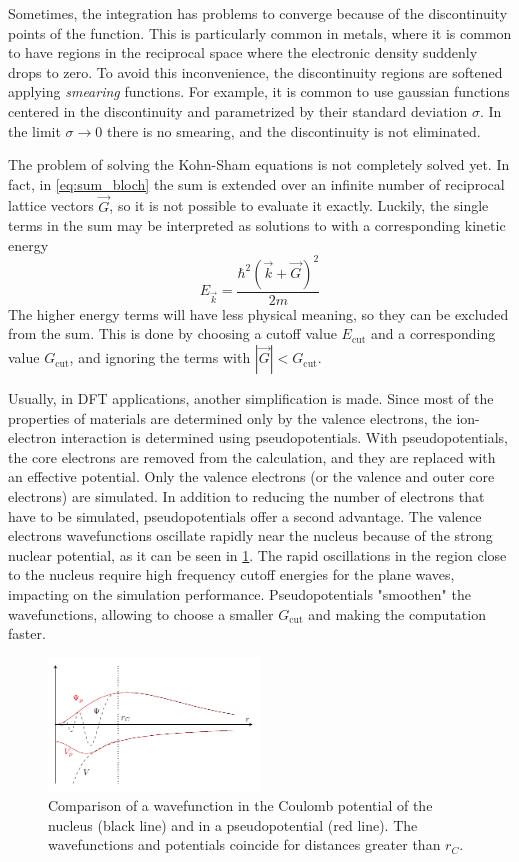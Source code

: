 Sometimes, the integration has problems to converge because of the discontinuity points of the function. This is particularly common in metals, where it is common to have regions in the reciprocal space where the electronic density suddenly drops to zero. To avoid this inconvenience, the discontinuity regions are softened applying \emph{smearing} functions. For example, it is common to use gaussian functions centered in the discontinuity and parametrized by their standard deviation $\sigma$. In the limit $\sigma \rightarrow 0$ there is no smearing, and the discontinuity is not eliminated.

The problem of solving the Kohn-Sham equations is not completely solved yet. In fact, in \cref{eq:sum_bloch} the sum is extended over an infinite number of reciprocal lattice vectors $\vec{G}$, so it is not possible to evaluate it exactly. Luckily, the single terms in the sum may be interpreted as solutions to \sches with a corresponding kinetic energy
\begin{equation}
    E_\vec{k} = \frac{\hbar^2(\vec{k}+\vec{G})^2}{2m}
\end{equation}
The higher energy terms will have less physical meaning, so they can be excluded from the sum. This is done by choosing a cutoff value $E_\text{cut}$ and a corresponding value $G_\text{cut}$, and ignoring the terms with $|\vec{G}| < G_\text{cut}$.

Usually, in DFT applications, another simplification is made. Since most of the properties of materials are determined only by the valence electrons, the ion-electron interaction is determined using pseudopotentials. With pseudopotentials, the core electrons are removed from the calculation, and they are replaced with an effective potential. Only the valence electrons (or the valence and outer core electrons) are simulated. In addition to reducing the number of electrons that have to be simulated, pseudopotentials offer a second advantage. The valence electrons wavefunctions oscillate rapidly near the nucleus because of the strong nuclear potential, as it can be seen in \cref{fig:pseudopotential}. The rapid oscillations in the region close to the nucleus require high frequency cutoff energies for the plane waves, impacting on the simulation performance. Pseudopotentials "smoothen" the wavefunctions, allowing to choose a smaller $G_\text{cut}$ and making the computation faster.

\begin{figure}
    \centering
    \includegraphics[width=0.5\textwidth]{figures/pseudopotential/pseudopotential.pdf}
    \caption{Comparison of a wavefunction in the Coulomb potential of the nucleus (black line) and in a pseudopotential (red line). The wavefunctions and potentials coincide for distances greater than $r_C$.}
    \label{fig:pseudopotential}
\end{figure}
